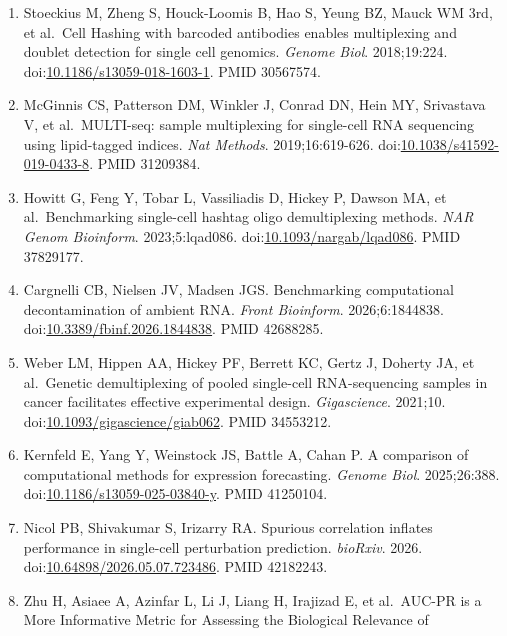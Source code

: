 \documentclass{article}
\begin{document}
\begin{enumerate}
  doi:\href{https://doi.org/10.1186/s13059-019-1865-2}{10.1186/s13059-019-1865-2}.
  PMID 31836005.
\item
  Stoeckius M, Zheng S, Houck-Loomis B, Hao S, Yeung BZ, Mauck WM 3rd,
  et al.~Cell Hashing with barcoded antibodies enables multiplexing and
  doublet detection for single cell genomics. \emph{Genome Biol}.
  2018;19:224.
  doi:\href{https://doi.org/10.1186/s13059-018-1603-1}{10.1186/s13059-018-1603-1}.
  PMID 30567574.
\item
  McGinnis CS, Patterson DM, Winkler J, Conrad DN, Hein MY, Srivastava
  V, et al.~MULTI-seq: sample multiplexing for single-cell RNA
  sequencing using lipid-tagged indices. \emph{Nat Methods}.
  2019;16:619-626.
  doi:\href{https://doi.org/10.1038/s41592-019-0433-8}{10.1038/s41592-019-0433-8}.
  PMID 31209384.
\item
  Howitt G, Feng Y, Tobar L, Vassiliadis D, Hickey P, Dawson MA, et
  al.~Benchmarking single-cell hashtag oligo demultiplexing methods.
  \emph{NAR Genom Bioinform}. 2023;5:lqad086.
  doi:\href{https://doi.org/10.1093/nargab/lqad086}{10.1093/nargab/lqad086}.
  PMID 37829177.
\item
  Cargnelli CB, Nielsen JV, Madsen JGS. Benchmarking computational
  decontamination of ambient RNA. \emph{Front Bioinform}.
  2026;6:1844838.
  doi:\href{https://doi.org/10.3389/fbinf.2026.1844838}{10.3389/fbinf.2026.1844838}.
  PMID 42688285.
\item
  Weber LM, Hippen AA, Hickey PF, Berrett KC, Gertz J, Doherty JA, et
  al.~Genetic demultiplexing of pooled single-cell RNA-sequencing
  samples in cancer facilitates effective experimental design.
  \emph{Gigascience}. 2021;10.
  doi:\href{https://doi.org/10.1093/gigascience/giab062}{10.1093/gigascience/giab062}.
  PMID 34553212.
\item
  Kernfeld E, Yang Y, Weinstock JS, Battle A, Cahan P. A comparison of
  computational methods for expression forecasting. \emph{Genome Biol}.
  2025;26:388.
  doi:\href{https://doi.org/10.1186/s13059-025-03840-y}{10.1186/s13059-025-03840-y}.
  PMID 41250104.
\item
  Nicol PB, Shivakumar S, Irizarry RA. Spurious correlation inflates
  performance in single-cell perturbation prediction. \emph{bioRxiv}.
  2026.
  doi:\href{https://doi.org/10.64898/2026.05.07.723486}{10.64898/2026.05.07.723486}.
  PMID 42182243.
\item
  Zhu H, Asiaee A, Azinfar L, Li J, Liang H, Irajizad E, et al.~AUC-PR
  is a More Informative Metric for Assessing the Biological Relevance of

\end{enumerate}
\end{document}
